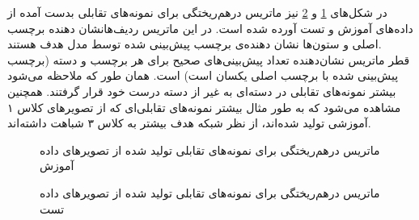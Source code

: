 \newpage
در شکل‌های
\ref{trainset_confusion_matrix} 
و 
\ref{testset_confusion_matrix} 
نیز ماتریس درهم‌ریختگی برای نمونه‌های تقابلی بدست آمده از داده‌های آموزش و تست آورده شده است. در این ماتریس ردیف‌هانشان دهنده برچسب اصلی و ستون‌ها نشان دهنده‌ی برچسب پیش‌بینی شده توسط مدل هدف هستند.
\\
قطر ماتریس نشان‌دهنده تعداد پیش‌بینی‌های صحیح برای هر برچسب و دسته (برچسب پیش‌بینی شده با برچسب اصلی یکسان است) است. همان طور که ملاحظه می‌شود بیشتر نمو‌نه‌های تقابلی در دسته‌ای به غیر از دسته درست خود قرار گرفتند. همچنین مشاهده می‌شود که به طور مثال بیشتر نمونه‌های تقابلی‌ای که از تصویر‌های کلاس ۱ آموزشی تولید شده‌اند، از نظر شبکه هدف بیشتر به کلاس ۳ شباهت داشته‌اند.
\begin{figure}[H]
	\caption{ماتریس درهم‌ریختگی برای نمونه‌های تقابلی تولید شده از تصویر‌های داده آموزش}
	\label{trainset_confusion_matrix}
\end{figure}

\begin{figure}[H]
	\caption{ماتریس درهم‌ریختگی برای نمونه‌های تقابلی تولید شده از تصویر‌های داده تست}
	\label{testset_confusion_matrix}
\end{figure}